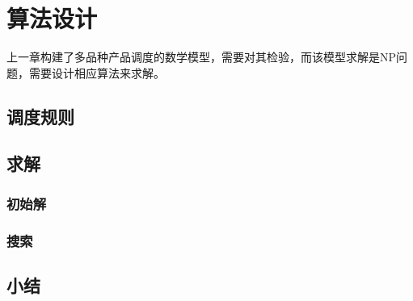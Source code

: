 \chapter{算法设计}
上一章构建了多品种产品调度的数学模型，需要对其检验，而该模型求解是NP问题，需要设计相应算法来求解。
\section{调度规则}

\section{求解}

\subsection{初始解}

\subsection{搜索}


\section{小结}